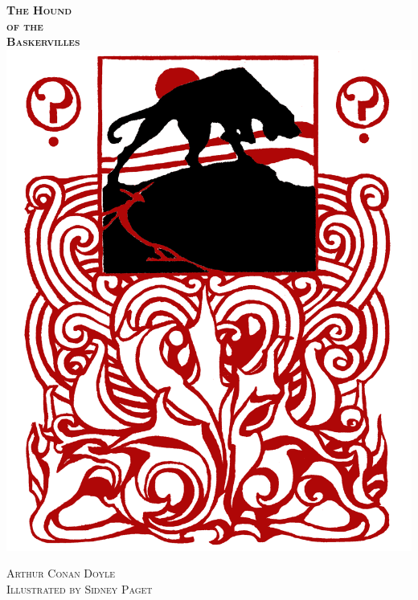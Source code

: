 \documentclass[
paper=5.5in:8.5in,
BCOR=7mm,
twoside,
DIV=calc,
11pt,
usegeometry,
chapterprefix,
endperiod,
headings=big]{scrbook} %
\newcommand{\HUGE}{\fontsize{50}{60}\selectfont}
\newcommand{\moderatelyhuge}{\fontsize{50}{60}\selectfont}
\newcommand{\reasonablyhuge}{\fontsize{30}{40}\selectfont}
\begin{document}
\renewcommand*\raggedchapter{\centering}
\thispagestyle{empty}

  \begin{titlepage}
   \recalctypearea

  \begin{center}\scshape\bfseries
{\HUGE The Hound}\\
\vspace{0.5cm}
{\moderatelyhuge of the}\\
\vspace{0.2cm}
{\HUGE Baskervilles}\\
\vspace*{0.1cm}
 \includegraphics[width=.8\linewidth]{houndfront}
 \end{center}
 \vspace*{0.1cm}
 \begin{center}\scshape
{\reasonablyhuge Arthur Conan Doyle}\\
\vspace{0.5cm}
{\Huge Illustrated by Sidney Paget}
\end{center}
  \end{titlepage}
\end{document}
